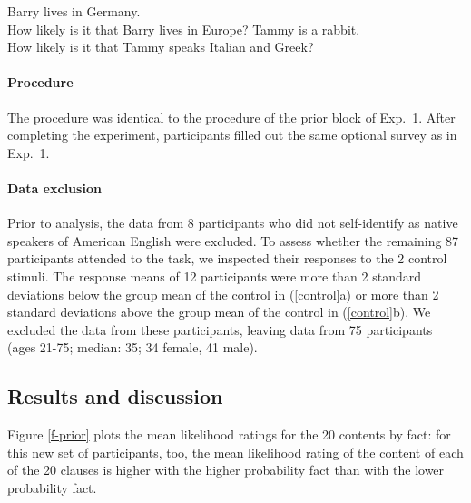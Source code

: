 \documentclass[11pt,fleqn]{article}
\newcommand{\6}{\mbox{$[\hspace*{-.6mm}[$}}
\newcommand{\9}{\mbox{$]\hspace*{-.6mm}]$}}
\begin{document}
\begin{exe}
\ex\label{control2}
\begin{xlist}
 Barry lives in Germany. \\ How likely is it that Barry lives in Europe?
 Tammy is a rabbit. \\ How likely is it that Tammy speaks Italian and Greek?
\end{xlist}
\end{exe}

\paragraph{Procedure} The procedure was identical to the procedure of the prior block of Exp.~1. After completing the experiment, participants filled out the same optional survey as in Exp.~1.

\paragraph{Data exclusion} Prior to analysis, the data from 8 participants who did not self-identify as native speakers of American English were excluded. To assess whether the remaining 87 participants attended to the task, we inspected their responses to the 2 control stimuli. The response means of 12 participants were more than 2 standard deviations below the group mean of the control in (\ref{control}a) or more than 2 standard deviations above the group mean of the control in (\ref{control}b). We excluded the data from these participants, leaving data from 75 participants (ages 21-75; median: 35; 34 female, 41 male).

\subsection{Results and discussion}

Figure \ref{f-prior} plots the mean likelihood ratings for the 20 contents by fact: for this new set of participants, too, the mean likelihood rating of the content of each of the 20 clauses is higher with the higher probability fact than with the lower probability fact. 
\end{document}
